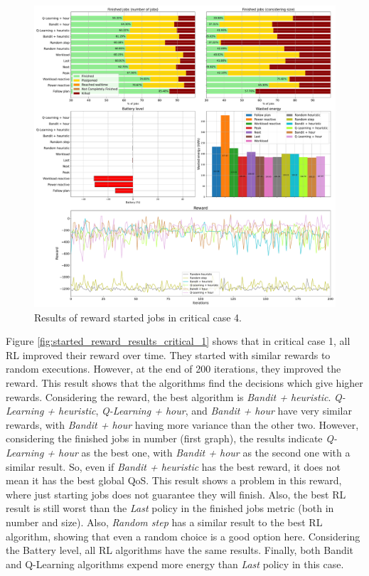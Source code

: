 \begin{figure}[!htb]
    \centering
    \includegraphics[scale=0.29]{Images/Learning_compensations/reward_started_profile_worst_workload_2_with_noise_state_delta.pdf}
    \caption{Results of reward started jobs in critical case 4.}
    \label{fig:started_reward_results_critical_4}
\end{figure}

Figure \ref{fig:started_reward_results_critical_1} shows that in critical case 1, all RL improved their reward over time. They started with similar rewards to random executions. However, at the end of 200 iterations, they improved the reward. This result shows that the algorithms find the decisions which give higher rewards. Considering the reward, the best algorithm is \emph{Bandit + heuristic}. \emph{Q-Learning + heuristic}, \emph{Q-Learning + hour}, and \emph{Bandit + hour} have very similar rewards, with \emph{Bandit + hour} having more variance than the other two. However, considering the finished jobs in number (first graph), the results indicate \emph{Q-Learning + hour} as the best one, with \emph{Bandit + hour} as the second one with a similar result. So, even if \emph{Bandit + heuristic} has the best reward, it does not mean it has the best global QoS. This result shows a problem in this reward, where just starting jobs does not guarantee they will finish. Also, the best RL result is still worst than the \emph{Last} policy in the finished jobs metric (both in number and size). Also, \emph{Random step} has a similar result to the best RL algorithm, showing that even a random choice is a good option here. Considering the Battery level, all RL algorithms have the same results. Finally, both Bandit and Q-Learning algorithms expend more energy than \emph{Last} policy in this case.

